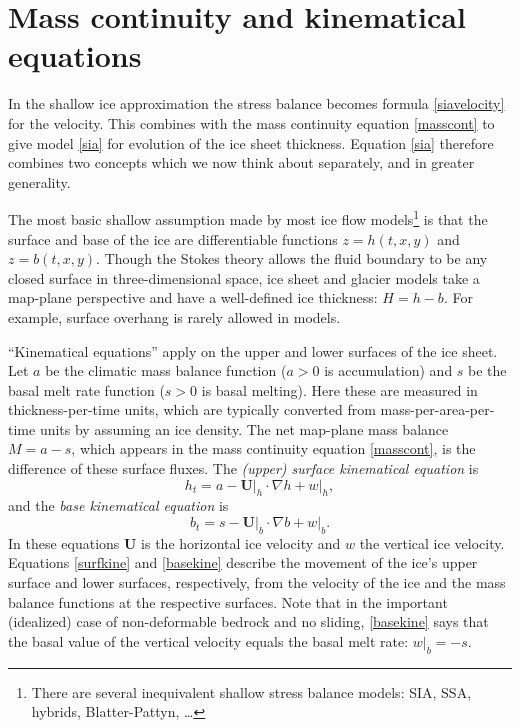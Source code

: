 \documentclass[letterpaper,final,12pt,reqno]{amsart}
\newcommand{\grad}{\nabla}
\begin{document}
\section{Mass continuity and kinematical equations}   \label{sec:masscont}

In the shallow ice approximation the stress balance becomes formula \eqref{siavelocity} for the velocity.  This combines with the mass continuity equation \eqref{masscont} to give model \eqref{sia} for evolution of the ice sheet thickness.  Equation \eqref{sia} therefore combines two concepts which we now think about separately, and in greater generality.

The most basic shallow assumption made by most ice flow models\footnote{There are several inequivalent shallow stress balance models: SIA, SSA, hybrids, Blatter-Pattyn, \dots} is that the surface and base of the ice are differentiable functions $z=h(t,x,y)$ and $z=b(t,x,y)$.  Though the Stokes theory allows the fluid boundary to be any closed surface in three-dimensional space, ice sheet and glacier models take a map-plane perspective and have a well-defined ice thickness: $H=h-b$.  For example, surface overhang is rarely allowed in models.

``Kinematical equations'' apply on the upper and lower surfaces of the ice sheet.  Let $a$ be the climatic mass balance function ($a>0$ is accumulation) and $s$ be the basal melt rate function ($s>0$ is basal melting).  Here these are measured in thickness-per-time units, which are typically converted from mass-per-area-per-time units by assuming an ice density.  The net map-plane mass balance $M=a-s$, which appears in the mass continuity equation \eqref{masscont}, is the difference of these surface fluxes.  The \emph{(upper) surface kinematical equation} is 
\begin{equation}
h_t = a - \mathbf{U}\big|_h \cdot \grad h + w\big|_h,  \label{surfkine}
\end{equation}
and the \emph{base kinematical equation} is
\begin{equation}
b_t = s - \mathbf{U}\big|_b \cdot \grad b + w\big|_b.  \label{basekine}
\end{equation}
In these equations $\mathbf{U}$ is the horizontal ice velocity and $w$ the vertical ice velocity.  Equations \eqref{surfkine} and \eqref{basekine} describe the movement of the ice's upper surface and lower surfaces, respectively, from the velocity of the ice and the mass balance functions at the respective surfaces.  Note that in the important (idealized) case of non-deformable bedrock and no sliding, \eqref{basekine} says that the basal value of the vertical velocity equals the basal melt rate: $w\big|_b=-s$.
\end{document}

